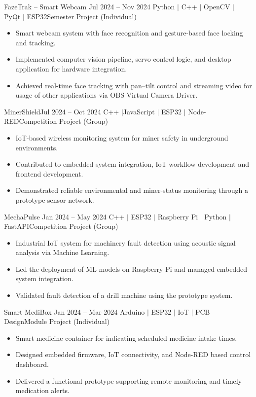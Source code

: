 \resumeSubheading
{FazeTrak -- Smart Webcam \href{https://github.com/AkinduID/FazeTrak}{\faGithub}}{Jul 2024 -- Nov 2024}
{Python $|$ C++ $|$ OpenCV $|$ PyQt $|$ ESP32}{Semester Project (Individual)}
\begin{itemize}
    \item Smart webcam system with face recognition and gesture-based face locking and tracking.
    \item Implemented computer vision pipeline, servo control logic, and desktop application for hardware integration.
    \item Achieved real-time face tracking with pan--tilt control and streaming video for usage of other applications via OBS Virtual Camera Driver.
\end{itemize}

\resumeSubheading
{MinerShield}{Jul 2024 -- Oct 2024}
{C++ $|$JavaScript $|$ ESP32 $|$ Node-RED}{Competition Project (Group)}
\begin{itemize}
    \item IoT-based wireless monitoring system for miner safety in underground environments.
    \item Contributed to embedded system integration, IoT workflow development and frontend development.
    \item Demonstrated reliable environmental and miner-status monitoring through a prototype sensor network.
\end{itemize}

\resumeSubheading
{MechaPulse \href{https://github.com/AkinduID/MechaPulse}{\faGithub}}{Jan 2024 -- May 2024}
{C++ $|$ ESP32 $|$ Raspberry Pi $|$ Python $|$ FastAPI}{Competition Project (Group)}
\begin{itemize}
    \item Industrial IoT system for machinery fault detection using acoustic signal analysis via Machine Learning.
    \item Led the deployment of ML models on Raspberry Pi and managed embedded system integration.
    \item Validated fault detection of a drill machine using the prototype system.
\end{itemize}

\resumeSubheading
{Smart MediBox \href{https://github.com/AkinduID/Smart-MediBox}{\faGithub}}{Jan 2024 -- Mar 2024}
{Arduino $|$ ESP32 $|$ IoT $|$ PCB Design}{Module Project (Individual)}
\begin{itemize}
    \item Smart medicine container for indicating scheduled medicine intake times.
    \item Designed embedded firmware, IoT connectivity, and Node-RED based control dashboard.
    \item Delivered a functional prototype supporting remote monitoring and timely medication alerts.
\end{itemize}

